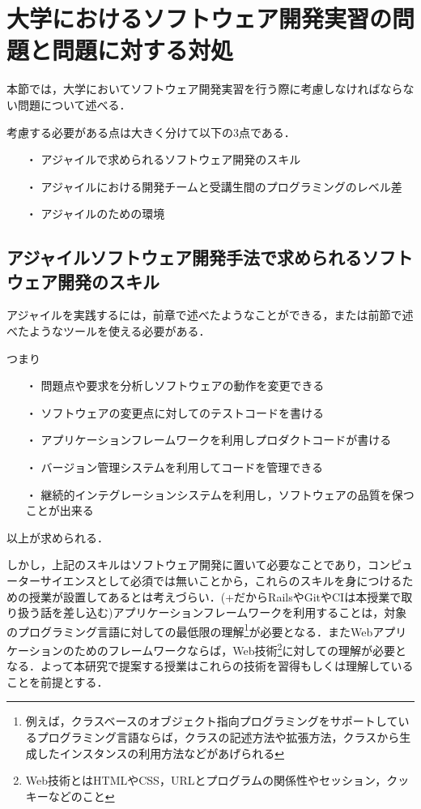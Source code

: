 \section{大学におけるソフトウェア開発実習の問題と問題に対する対処}

本節では，大学においてソフトウェア開発実習を行う際に考慮しなければならない問題について述べる．

考慮する必要がある点は大きく分けて以下の3点である．

\begin{itemize}
\item[・] アジャイルで求められるソフトウェア開発のスキル
\item[・] アジャイルにおける開発チームと受講生間のプログラミングのレベル差
\item[・] アジャイルのための環境
\end{itemize}

\subsection{アジャイルソフトウェア開発手法で求められるソフトウェア開発のスキル}

アジャイルを実践するには，前章で述べたようなことができる，または前節で述べたようなツールを使える必要がある．

つまり

\begin{itemize}
\item[・]問題点や要求を分析しソフトウェアの動作を変更できる
\item[・]ソフトウェアの変更点に対してのテストコードを書ける
\item[・]アプリケーションフレームワークを利用しプロダクトコードが書ける
\item[・]バージョン管理システムを利用してコードを管理できる
\item[・]継続的インテグレーションシステムを利用し，ソフトウェアの品質を保つことが出来る
\end{itemize}

以上が求められる．

しかし，上記のスキルはソフトウェア開発に置いて必要なことであり，コンピューターサイエンスとして必須では無いことから，これらのスキルを身につけるための授業が設置してあるとは考えづらい．(+だからRailsやGitやCIは本授業で取り扱う話を差し込む)アプリケーションフレームワークを利用することは，対象のプログラミング言語に対しての最低限の理解\footnote{例えば，クラスベースのオブジェクト指向プログラミングをサポートしているプログラミング言語ならば，クラスの記述方法や拡張方法，クラスから生成したインスタンスの利用方法などがあげられる}が必要となる．またWebアプリケーションのためのフレームワークならば，Web技術\footnote{Web技術とはHTMLやCSS，URLとプログラムの関係性やセッション，クッキーなどのこと}に対しての理解が必要となる．よって本研究で提案する授業はこれらの技術を習得もしくは理解していることを前提とする．



